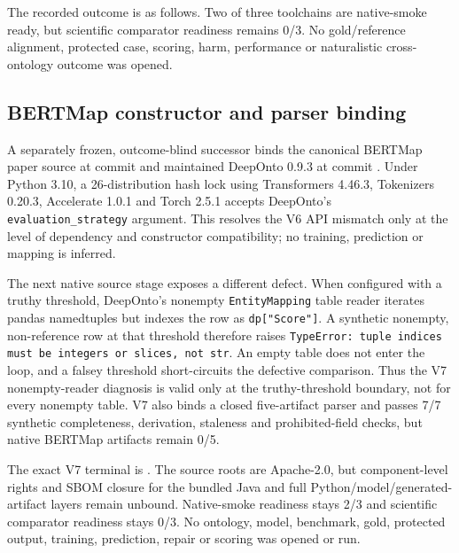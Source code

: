 The recorded outcome is as follows.
Two of three toolchains are native-smoke ready, but scientific comparator readiness remains 0/3.  No gold/reference alignment, protected case, scoring,
harm, performance or naturalistic cross-ontology outcome was opened.

\subsection{BERTMap constructor and parser binding}

A separately frozen, outcome-blind successor binds the canonical BERTMap
paper source at commit 
and maintained DeepOnto 0.9.3 at commit
.  Under Python 3.10, a
26-distribution hash lock using Transformers 4.46.3, Tokenizers 0.20.3,
Accelerate 1.0.1 and Torch 2.5.1 accepts DeepOnto's
\texttt{evaluation\_strategy} argument.  This resolves the V6 API mismatch only at the level of dependency and constructor compatibility; no training, prediction or
mapping is inferred.

The next native source stage exposes a different defect.  When configured with
a truthy threshold, DeepOnto's nonempty \texttt{EntityMapping} table reader
iterates pandas namedtuples but indexes the row as \texttt{dp["Score"]}. A
synthetic nonempty, non-reference row at that threshold therefore raises
\texttt{TypeError: tuple indices must be integers or slices, not str}.  An
empty table does not enter the loop, and a falsey threshold short-circuits the
defective comparison. Thus the V7 nonempty-reader diagnosis is valid only at
the truthy-threshold boundary, not for every nonempty table. V7 also binds a
closed five-artifact parser and passes 7/7 synthetic completeness, derivation,
staleness and prohibited-field checks, but native BERTMap artifacts remain 0/5.

The exact V7 terminal is
.
The source roots are Apache-2.0, but component-level rights and SBOM closure for
the bundled Java and full Python/model/generated-artifact layers remain
unbound. Native-smoke readiness stays 2/3 and scientific comparator readiness
stays 0/3. No ontology, model, benchmark, gold, protected output, training,
prediction, repair or scoring was opened or run.

